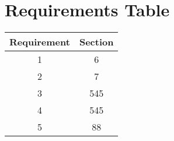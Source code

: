 
\section{Requirements Table}

\begin{center}
 \begin{tabular}{||c c ||} 
 \hline
 Requirement & Section \\ [0.5ex] 
 \hline\hline
 1 & 6  \\ 
 \hline
 2 & 7 \\
 \hline
 3 & 545 \\
 \hline
 4 & 545 \\
 \hline
 5 & 88 \\ [1ex] 
 \hline
\end{tabular}
\end{center}